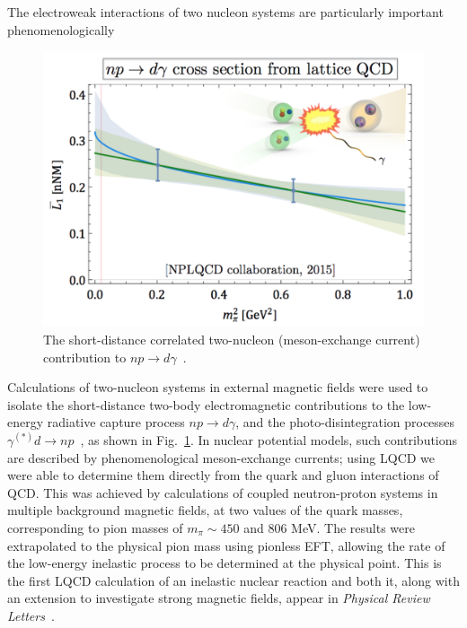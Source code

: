 The electroweak interactions of two nucleon systems are particularly important phenomenologically 
\begin{figure}
	\centering
	\includegraphics[width=0.48\columnwidth]{figures/npTOdgamma.png}  
	\caption{ 
		The short-distance correlated two-nucleon (meson-exchange current)
		contribution to $np\rightarrow d\gamma$~\protect\cite{Beane:2015yha}.    
	}
	\label{fig:L1bar}
	\vspace*{-0.4cm}
\end{figure}
%
Calculations of two-nucleon systems in external magnetic fields were used to isolate the
short-distance two-body electromagnetic contributions to the low-energy radiative capture process $np\rightarrow d\gamma$,
and the photo-disintegration processes $\gamma^{(*)}d\rightarrow np$~\cite{Beane:2015yha},
as shown in Fig.~\ref{fig:L1bar}. 
In nuclear potential models, such contributions are described by 
phenomenological meson-exchange currents; using LQCD we were able to determine them directly from the quark and gluon interactions of QCD.
This was achieved by calculations of coupled neutron-proton systems in multiple background magnetic fields, at two values of the 
quark masses, corresponding to pion masses of $m_\pi\sim 450$ and 806 MeV. The results were extrapolated to the physical pion mass using pionless EFT, allowing the rate of the low-energy inelastic process to be determined 
at the physical point. 
%
%
This is the first LQCD calculation of an inelastic nuclear reaction and both it, along with an extension to investigate strong magnetic fields, appear 
in {\it Physical Review Letters}~\cite{Beane:2015yha,Detmold:2015daa}. 




